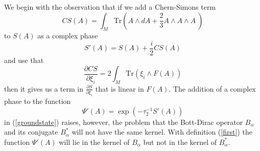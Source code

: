 \documentclass[12pt]{article}
\def\a{\alpha}
\newcommand{\pa}{\partial}
\begin{document}
We begin with the observation that if we add a Chern-Simons term 
\begin{equation}
CS(A) =  \int_M \mbox{Tr} \left( {A}\wedge d{A} + \frac{2}{3} {A}\wedge {A} \wedge {A}\  \right)
\label{CS}
\end{equation}
 to $S(A)$ as a complex phase
\begin{equation}
S'(A) =S(A) + \frac{{i}}{2} CS(A)
\label{first}
\end{equation}
and use that
\begin{equation}
\frac{\pa CS}{\pa \xi_i} =  2 \int_M \mbox{Tr}\left(\xi_i\wedge F(A)  \right)
\label{godhavn}
\end{equation}
then it gives us a term in $\frac{\pa S}{\pa \xi_i}$ that is linear in $F(A)$. The addition of a complex phase to the function 
\begin{equation}
\Psi'(A) =  \exp\left( - \tau_2^{-1} S'(A)  \right)
\label{groundstate2}
\end{equation}
in (\ref{groundstate}) raises, however, the problem that the Bott-Dirac operator $B_\a$ and its conjugate $B_\a^*$ will not have the same kernel. With definition (\ref{first}) the function $\Psi'(A)$ will lie in the kernel of $B_\a$ but not in the kernel of $B_\a^*$. 
\end{document}
